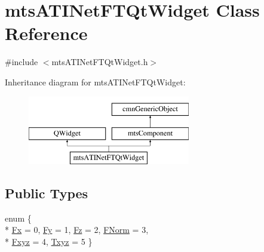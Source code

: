 \hypertarget{classmts_a_t_i_net_f_t_qt_widget}{\section{mts\-A\-T\-I\-Net\-F\-T\-Qt\-Widget Class Reference}
\label{classmts_a_t_i_net_f_t_qt_widget}
}


{\ttfamily \#include $<$mts\-A\-T\-I\-Net\-F\-T\-Qt\-Widget.\-h$>$}

Inheritance diagram for mts\-A\-T\-I\-Net\-F\-T\-Qt\-Widget\-:\begin{figure}[H]
\begin{center}
\leavevmode
\includegraphics[height=3.000000cm]{dc/d5e/classmts_a_t_i_net_f_t_qt_widget}
\end{center}
\end{figure}
\subsection*{Public Types}
\begin{DoxyCompactItemize}
\item 
enum \{ \\*
\hyperlink{classmts_a_t_i_net_f_t_qt_widget_ab78b08d23ea24f68e749276d72a493faae583275fc5a378f94cb11497f6fc175c}{Fx} = 0, 
\hyperlink{classmts_a_t_i_net_f_t_qt_widget_ab78b08d23ea24f68e749276d72a493faac22fef7e562866697cac9c79ba88c887}{Fy} = 1, 
\hyperlink{classmts_a_t_i_net_f_t_qt_widget_ab78b08d23ea24f68e749276d72a493faaa16a6c2e88cfb7160fb53fc69537a64e}{Fz} = 2, 
\hyperlink{classmts_a_t_i_net_f_t_qt_widget_ab78b08d23ea24f68e749276d72a493faa34b6cfa3120b2b42d926f53c7215da17}{F\-Norm} = 3, 
\\*
\hyperlink{classmts_a_t_i_net_f_t_qt_widget_ab78b08d23ea24f68e749276d72a493faaa08c4ae905f9cf6bd352474b84813ab3}{Fxyz} = 4, 
\hyperlink{classmts_a_t_i_net_f_t_qt_widget_ab78b08d23ea24f68e749276d72a493faaae384dd0e812478ec5a53b416311fc38}{Txyz} = 5
 \}
\end{DoxyCompactItemize}
